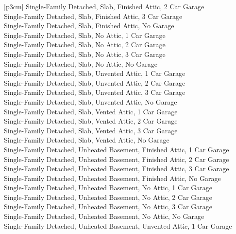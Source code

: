 \begin{customLongTable}{ |p{3cm}| }
Single-Family Detached, Slab, Finished Attic, 2 Car Garage \\ \hline
Single-Family Detached, Slab, Finished Attic, 3 Car Garage \\ \hline
Single-Family Detached, Slab, Finished Attic, No Garage \\ \hline
Single-Family Detached, Slab, No Attic, 1 Car Garage \\ \hline
Single-Family Detached, Slab, No Attic, 2 Car Garage \\ \hline
Single-Family Detached, Slab, No Attic, 3 Car Garage \\ \hline
Single-Family Detached, Slab, No Attic, No Garage \\ \hline
Single-Family Detached, Slab, Unvented Attic, 1 Car Garage \\ \hline
Single-Family Detached, Slab, Unvented Attic, 2 Car Garage \\ \hline
Single-Family Detached, Slab, Unvented Attic, 3 Car Garage \\ \hline
Single-Family Detached, Slab, Unvented Attic, No Garage \\ \hline
Single-Family Detached, Slab, Vented Attic, 1 Car Garage \\ \hline
Single-Family Detached, Slab, Vented Attic, 2 Car Garage \\ \hline
Single-Family Detached, Slab, Vented Attic, 3 Car Garage \\ \hline
Single-Family Detached, Slab, Vented Attic, No Garage \\ \hline
Single-Family Detached, Unheated Basement, Finished Attic, 1 Car Garage \\ \hline
Single-Family Detached, Unheated Basement, Finished Attic, 2 Car Garage \\ \hline
Single-Family Detached, Unheated Basement, Finished Attic, 3 Car Garage \\ \hline
Single-Family Detached, Unheated Basement, Finished Attic, No Garage \\ \hline
Single-Family Detached, Unheated Basement, No Attic, 1 Car Garage \\ \hline
Single-Family Detached, Unheated Basement, No Attic, 2 Car Garage \\ \hline
Single-Family Detached, Unheated Basement, No Attic, 3 Car Garage \\ \hline
Single-Family Detached, Unheated Basement, No Attic, No Garage \\ \hline
Single-Family Detached, Unheated Basement, Unvented Attic, 1 Car Garage \\ \hline

\end{customLongTable}
